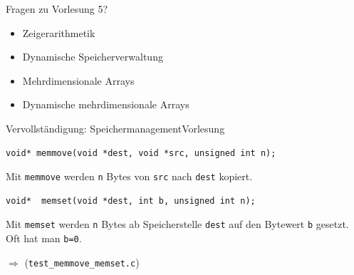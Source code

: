 \documentclass[xcolor=dvipsnames]{beamer}
\newcounter{lecturecounter}
\begin{document}

\begin{frame}[fragile]{Fragen zu Vorlesung 5?}
  \begin{itemize}
    \item{Zeigerarithmetik}
    \vspace{0.2cm}
    \item{Dynamische Speicherverwaltung}
    \vspace{0.2cm}
    \item{Mehrdimensionale Arrays}
    \vspace{0.2cm}
    \item{Dynamische mehrdimensionale Arrays}
  \end{itemize}
\end{frame}

\begin{frame}[fragile]{Vervollständigung: Speichermanagement}{Vorlesung }
\begin{lstlisting}
void* memmove(void *dest, void *src, unsigned int n);
\end{lstlisting}
  \begin{block}{}
    Mit \texttt{memmove} werden \texttt{n} Bytes von \texttt{src} nach \texttt{dest} kopiert.
  \end{block}

\begin{lstlisting}
void*  memset(void *dest, int b, unsigned int n);
\end{lstlisting}
  \begin{block}{}
    Mit \texttt{memset} werden \texttt{n} Bytes ab Speicherstelle \verb|dest| auf den Bytewert \verb|b| gesetzt. Oft hat man \verb|b=0|.
  \end{block}
  $\Rightarrow$ (\verb|test_memmove_memset.c|)
\end{frame}
\end{document}
